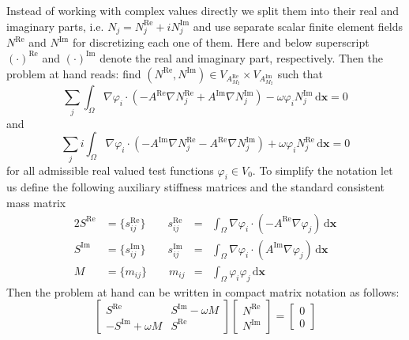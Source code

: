 \documentclass[11pt,a4paper]{article}
\begin{document}
Instead of working with complex values directly we split them into their real and imaginary parts, i.e. $N_j=N_j^\mathrm{Re}+iN_j^\mathrm{Im}$ and use separate scalar finite element fields $N^\mathrm{Re}$ and $N^\mathrm{Im}$ for discretizing each one of them. Here and below superscript $(\cdot)^\mathrm{Re}$ and $(\cdot)^\mathrm{Im}$ denote the real and imaginary part, respectively. Then the problem at hand reads: find $(N^\mathrm{Re},N^\mathrm{Im})\in V_{A_{M_2}^\mathrm{Re}}\times V_{A_{M_2}^\mathrm{Im}}$ such that
\begin{equation}
\sum_j\int_\Omega \nabla\varphi_i\cdot\left(-A^\mathrm{Re}\nabla N_j^\mathrm{Re}+A^\mathrm{Im}\nabla N_j^\mathrm{Im}\right)-\omega \varphi_i N_j^\mathrm{Im}\,\mathrm{d}\mathbf{x}=0
\end{equation}
and
\begin{equation}
\sum_ji\int_\Omega \nabla\varphi_i\cdot\left(-A^\mathrm{Im}\nabla N_j^\mathrm{Re}-A^\mathrm{Re}\nabla N_j^\mathrm{Im}\right)+\omega \varphi_i N_j^\mathrm{Re}\,\mathrm{d}\mathbf{x}=0
\end{equation}
for all admissible real valued test functions $\varphi_i\in V_{0}$.
To simplify the notation let us define the following auxiliary stiffness matrices and the standard consistent mass matrix
\begin{alignat}{2}
S^\mathrm{Re}&=\{s_{ij}^\mathrm{Re}\} \qquad s_{ij}^\mathrm{Re}&=&\int_\Omega \nabla\varphi_i\cdot(-A^\mathrm{Re}\nabla\varphi_j)\,\mathrm{d}\mathbf{x}\\
S^\mathrm{Im}&=\{s_{ij}^\mathrm{Im}\} \qquad s_{ij}^\mathrm{Im}&=&\int_\Omega \nabla\varphi_i\cdot(A^\mathrm{Im}\nabla\varphi_j)\,\mathrm{d}\mathbf{x}\\
M&=\{m_{ij}\} \qquad m_{ij}&=&\int_\Omega \varphi_i\varphi_j\,\mathrm{d}\mathbf{x}
\end{alignat}
Then the problem at hand can be written in compact matrix notation as follows:
\begin{equation}
\begin{bmatrix}
S^\mathrm{Re} & S^\mathrm{Im}-\omega M\\
-S^\mathrm{Im}+\omega M &  S^\mathrm{Re}
\end{bmatrix}
\begin{bmatrix}
N^\mathrm{Re}\\
N^\mathrm{Im}
\end{bmatrix}
=
\begin{bmatrix}
0\\
0
\end{bmatrix}
\end{equation}
\end{document}
